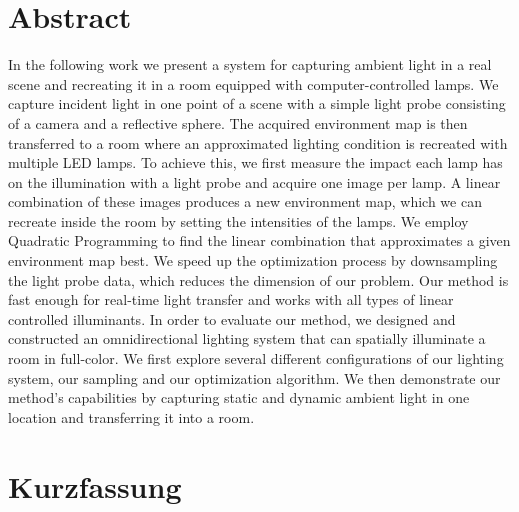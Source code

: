 \section{Abstract}

In the following work we present a system for capturing ambient light in a real scene and recreating it in a room equipped with computer-controlled lamps.
We capture incident light in one point of a scene with a simple light probe consisting of a camera and a reflective sphere.
The acquired environment map is then transferred to a room where an approximated lighting condition is recreated with multiple LED lamps. 
To achieve this, we first measure the impact each lamp has on the illumination with a light probe and acquire one image per lamp.
A linear combination of these images produces a new environment map, which we can recreate inside the room by setting the intensities of the lamps.
We employ Quadratic Programming to find the linear combination that approximates a given environment map best.
We speed up the optimization process by downsampling the light probe data, which reduces the dimension of our problem.
Our method is fast enough for real-time light transfer and works with all types of linear controlled illuminants.
In order to evaluate our method, we designed and constructed an omnidirectional lighting system that can spatially illuminate a room in full-color.
We first explore several different configurations of our lighting system, our sampling and our optimization algorithm.
We then demonstrate our method's capabilities by capturing static and dynamic ambient light in one location and transferring it into a room.

\section{Kurzfassung}


